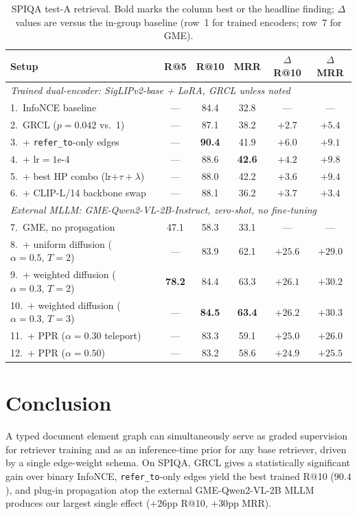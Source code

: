 \documentclass{article}
\begin{document}
\begin{table}[t]
\centering
\small
\caption{SPIQA test-A retrieval. Bold marks the column best or the
headline finding; $\Delta$ values are versus the in-group baseline (row~1
for trained encoders; row~7 for GME).}
\label{tab:main}
\begin{tabular}{lccccc}
\toprule
Setup & R@5 & R@10 & MRR & $\Delta$R@10 & $\Delta$MRR \\
\midrule
\multicolumn{6}{l}{\emph{Trained dual-encoder: SigLIPv2-base + LoRA, GRCL unless noted}} \\
1.\ InfoNCE baseline & --- & 84.4 & 32.8 & --- & --- \\
2.\ GRCL ($p\!=\!0.042$ vs.\ 1) & --- & 87.1 & 38.2 & $+2.7$ & $+5.4$ \\
3.\ \quad+ \texttt{refer\_to}-only edges & --- & \textbf{90.4} & 41.9 & $\mathbf{+6.0}$ & $+9.1$ \\
4.\ \quad+ $\text{lr}\!=\!1$e-4 & --- & 88.6 & \textbf{42.6} & $+4.2$ & $\mathbf{+9.8}$ \\
5.\ \quad+ best HP combo (lr$+\tau+\lambda$) & --- & 88.0 & 42.2 & $+3.6$ & $+9.4$ \\
6.\ \quad+ CLIP-L/14 backbone swap & --- & 88.1 & 36.2 & $+3.7$ & $+3.4$ \\
\midrule
\multicolumn{6}{l}{\emph{External MLLM: GME-Qwen2-VL-2B-Instruct, zero-shot, no fine-tuning}} \\
7.\ GME, no propagation & 47.1 & 58.3 & 33.1 & --- & --- \\
8.\ \quad+ uniform diffusion ($\alpha\!=\!0.5,\,T\!=\!2$) & --- & 83.9 & 62.1 & $+25.6$ & $+29.0$ \\
9.\ \quad+ weighted diffusion ($\alpha\!=\!0.3,\,T\!=\!2$) & \textbf{78.2} & 84.4 & 63.3 & $+26.1$ & $+30.2$ \\
10.\ \quad+ weighted diffusion ($\alpha\!=\!0.3,\,T\!=\!3$) & --- & \textbf{84.5} & \textbf{63.4} & $\mathbf{+26.2}$ & $\mathbf{+30.3}$ \\
11.\ \quad+ PPR ($\alpha\!=\!0.30$ teleport) & --- & 83.3 & 59.1 & $+25.0$ & $+26.0$ \\
12.\ \quad+ PPR ($\alpha\!=\!0.50$) & --- & 83.2 & 58.6 & $+24.9$ & $+25.5$ \\
\bottomrule
\end{tabular}
\end{table}


\section{Conclusion}

A typed document element graph can simultaneously serve as graded
supervision for retriever training and as an inference-time prior for any
base retriever, driven by a single edge-weight schema. On SPIQA, GRCL
gives a statistically significant gain over binary InfoNCE,
\texttt{refer\_to}-only edges yield the best trained R@10 ($90.4$), and
plug-in propagation atop the external GME-Qwen2-VL-2B MLLM produces our
largest single effect ($+26$pp R@10, $+30$pp MRR).


\newpage




\end{document}
